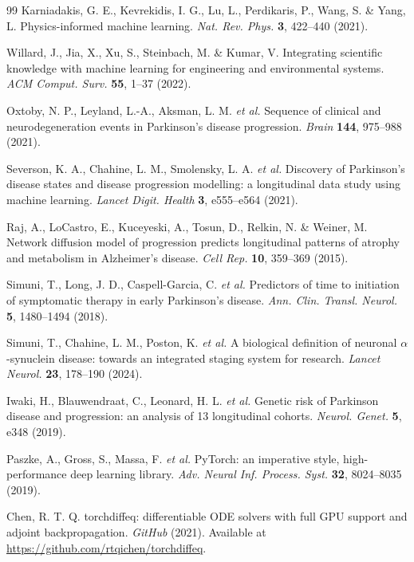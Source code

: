 \begin{thebibliography}{99}
 Karniadakis, G. E., Kevrekidis, I. G., Lu, L., Perdikaris, P., Wang, S. \& Yang, L. Physics-informed machine learning. \textit{Nat. Rev. Phys.} \textbf{3}, 422--440 (2021).

 Willard, J., Jia, X., Xu, S., Steinbach, M. \& Kumar, V. Integrating scientific knowledge with machine learning for engineering and environmental systems. \textit{ACM Comput. Surv.} \textbf{55}, 1--37 (2022).

 Oxtoby, N. P., Leyland, L.-A., Aksman, L. M. \textit{et al.} Sequence of clinical and neurodegeneration events in Parkinson's disease progression. \textit{Brain} \textbf{144}, 975--988 (2021).

 Severson, K. A., Chahine, L. M., Smolensky, L. A. \textit{et al.} Discovery of Parkinson's disease states and disease progression modelling: a longitudinal data study using machine learning. \textit{Lancet Digit. Health} \textbf{3}, e555--e564 (2021).

 Raj, A., LoCastro, E., Kuceyeski, A., Tosun, D., Relkin, N. \& Weiner, M. Network diffusion model of progression predicts longitudinal patterns of atrophy and metabolism in Alzheimer's disease. \textit{Cell Rep.} \textbf{10}, 359--369 (2015).

 Simuni, T., Long, J. D., Caspell-Garcia, C. \textit{et al.} Predictors of time to initiation of symptomatic therapy in early Parkinson's disease. \textit{Ann. Clin. Transl. Neurol.} \textbf{5}, 1480--1494 (2018).

 Simuni, T., Chahine, L. M., Poston, K. \textit{et al.} A biological definition of neuronal $\alpha$-synuclein disease: towards an integrated staging system for research. \textit{Lancet Neurol.} \textbf{23}, 178--190 (2024).

 Iwaki, H., Blauwendraat, C., Leonard, H. L. \textit{et al.} Genetic risk of Parkinson disease and progression: an analysis of 13 longitudinal cohorts. \textit{Neurol. Genet.} \textbf{5}, e348 (2019).

 Paszke, A., Gross, S., Massa, F. \textit{et al.} PyTorch: an imperative style, high-performance deep learning library. \textit{Adv. Neural Inf. Process. Syst.} \textbf{32}, 8024--8035 (2019).

 Chen, R. T. Q. torchdiffeq: differentiable ODE solvers with full GPU support and adjoint backpropagation. \textit{GitHub} (2021). Available at \url{https://github.com/rtqichen/torchdiffeq}.


\end{thebibliography}
